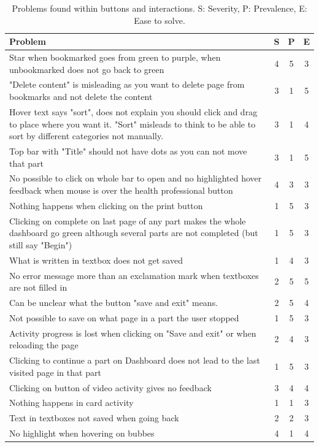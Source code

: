 \documentclass{sigchi}
\begin{document}
\begin{table}[H]
    \centering
    \begin{tabular}{|m{6.5cm}|c|c|c|}
    \hline
        \textbf{Problem} & \textbf{S} & \textbf{P} & \textbf{E}\\
    \hline
         Star when bookmarked goes from green to purple, when unbookmarked does not go back to green  & 4 & 5 & 3\\
    \hline
         "Delete content" is misleading as you want to delete page from bookmarks and not delete the content & 3 & 1 & 5\\
    \hline
         Hover text says "sort", does not explain you should click and drag to place where you want it. "Sort" misleads to think to be able to sort by different categories not manually. & 3 & 1 & 4\\
    \hline
         Top bar with "Title" should not have dots as you can not move that part & 3 & 1 & 5\\
    \hline
         No possible to click on whole bar to open and no highlighted hover feedback when mouse is over the health professional button & 4 & 3 & 3\\
    \hline
         Nothing happens when clicking on the print button & 1 & 5 & 3\\
    \hline
         Clicking on complete on last page of any part makes the whole dashboard go green although several parts are not completed (but still say "Begin") & 1 & 5 & 3\\
    \hline
         What is written in textbox does not get saved & 1 & 4 & 3\\
    \hline
         No error message more than an exclamation mark when textboxes are not filled in & 2 & 5 & 5\\
    \hline
         Can be unclear what the button "save and exit" means. & 2 & 5 & 4\\
    \hline
         Not possible to save on what page in a part the user stopped & 1 & 5 & 3\\
    \hline
         Activity progress is lost when clicking on "Save and exit" or when reloading the page & 2 & 4 & 3\\
    \hline
         Clicking to continue a part on Dashboard does not lead to the last visited page in that part & 1 & 5 & 3\\
    \hline
         Clicking on button of video activity gives no feedback & 3 & 4 & 4\\
    \hline
         Nothing happens in card activity & 1 & 1 & 3\\
    \hline
         Text in textboxes not saved when going back & 2 & 2 & 3\\
    \hline
         No highlight when hovering on bubbes & 4 & 1 & 4\\
    \hline
    \end{tabular}
    \caption{Problems found within buttons and interactions. S: Severity, P: Prevalence, E: Ease to solve.}
    \label{tab:interactions}
\end{table}
\end{document}
